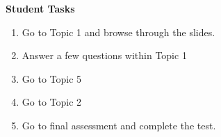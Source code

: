 \documentclass{l3proj}
\begin{document}
\textbf{Student Tasks}

\begin{enumerate}
\item Go to Topic 1 and browse through the slides.
\item Answer a few questions within Topic 1
\item Go to Topic 5
\item Go to Topic 2
\item Go to final assessment and complete the test.
\end{enumerate}
\end{document}
